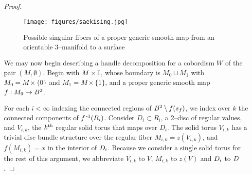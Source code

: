 \begin{proof}
	\begin{figure}
		\centering
		\captionsetup{justification=centering}
		\caption{Possible singular fibers of a proper generic smooth map from an orientable 3--manifold to a surface}
		\texttt{[image: figures/saekising.jpg]}
		\label{fig:saekising}
	\end{figure}
	
	We may now begin describing a handle decomposition for a cobordism $W$ of the pair $(M,\emptyset)$.
	Begin with $M\times\mathbb{I}$, whose boundary is $M_0\sqcup M_1$ with $M_0=M\times\{0\}$ and $M_1 = M\times\{1\}$, and a proper generic smooth map $f:M_0\to B^2$.

	For each $i<\infty$ indexing the connected regions of $B^2\setminus f(s_f)$, we index over $k$ the connected components of $f^{\,\text{-}1}(R_i)$.
	Consider $D_i\subset R_i$, a 2--disc of regular values, and $V_{i,k}$, the $k^{\text{th}}$ regular solid torus that maps over $D_i$.
	The solid torus $V_{i,k}$ has a trivial disc bundle structure over the regular fiber $M_{i,k}=z(V_{i,k})$, and $f(M_{i,k})=x$ in the interior of $D_i$.
	Because we consider a single solid torus for the rest of this argument, we abbreviate $V_{i,k}$ to $V$, $M_{i,k}$ to $z(V)$ and $D_i$ to $D$.


\end{proof}
